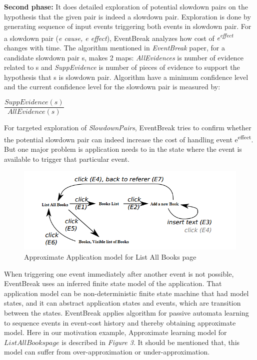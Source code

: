 \documentclass[authoryear,preprint, twocolumn]{sigplanconf}
\begin{document}
\newline \textbf{Second phase:} It does detailed exploration of potential slowdown pairs on the hypothesis that the given pair is indeed a slowdown pair. Exploration is done by generating sequence of input events triggering both events in slowdown pair. For a slowdown pair (\emph{e cause, e effect}), EventBreak analyzes how cost of \emph{e\textsuperscript{effect}} changes with time. The algorithm mentioned in \emph{EventBreak} paper, for a candidate slowdown pair s, makes 2 maps: \emph{AllEvidences} is number of evidence related to s and \emph{SuppEvidence} is number of pieces of evidence to support the hypothesis that s is slowdown pair. Algorithm have a minimum confidence level and the current confidence level for the slowdown pair is measured by:\begin{center}
	 $\dfrac{SuppEvidence(s)}{AllEvidence(s)}$\begin{center}	
	 \end{center}
\end{center}

\newline For targeted exploration of \emph{SlowdownPairs}, EventBreak tries to confirm whether the potential slowdown pair can indeed increase the cost of handling event e\textsuperscript{effect}. But one major problem is application needs to in the state where the event is available to trigger that particular event.

\begin{figure}[ht]
	\centering
	\includegraphics[width=1.0\linewidth]{figures/eventbreak2}
	\caption[Approximate Application model for List All Books page]{\label{f:eventcosthistory}Approximate Application model for List All Books page}
\end{figure}

\newline When triggering one event immediately after another event is not possible, EventBreak uses an inferred finite state model of the application. That application model can be non-deterministic finite state machine that had model states, and it can abstract application states and events, which are transition between the  states. EventBreak applies algorithm for passive automata learning to sequence events in event-cost history and thereby obtaining approximate model. Here in our motivation example, Approximate learning model for $List All Books page$ is described in \emph{Figure 3}. It should be mentioned that, this model can suffer from over-approximation or under-approximation.
\end{document}
